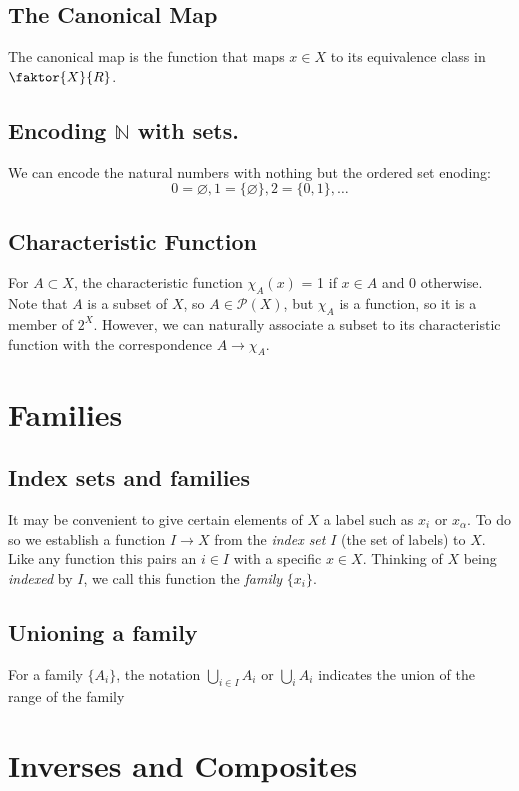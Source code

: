 \documentclass{article}
\newcommand{\pow}[1]{\mathscr{P}(#1)}
\begin{document}
\subsection{The Canonical Map} The canonical map is the function that maps $x \in X$ to its equivalence class in $\faktor{X}{R}$.

\subsection{Encoding $\mathbb{N}$ with sets.} We can encode the natural numbers with nothing but the ordered set enoding:
$$0 = \varnothing, 1 = \{\varnothing\}, 2 = \{0, 1\}, \ldots$$

\subsection{Characteristic Function} For $A \subset X$, the characteristic function $\chi_A(x)$ = 1 if $x \in A$ and 0 otherwise. Note that $A$ is a subset of $X$, so $A \in \pow{X}$, but $\chi_A$ is a function, so it is a member of $2^X$. However, we can naturally associate a subset to its characteristic function with the correspondence $A \longrightarrow \chi_A$.

\section{Families}

\subsection{Index sets and families} It may be convenient to give certain elements of $X$ a label such as $x_i$ or $x_\alpha$. To do so we establish a function $I \longrightarrow X$ from the \textit{index set} $I$ (the set of labels) to $X$. Like any function this pairs an $i \in I$ with a specific $x \in X$. Thinking of $X$ being \textit{indexed} by $I$, we call this function the \textit{family} $\{x_i\}$.

\subsection{Unioning a family} For a family $\{A_i\}$, the notation $\bigcup_{i \in I} A_i$ or $\bigcup_i A_i$ indicates the union of the range of the family


\section{Inverses and Composites}
\end{document}
